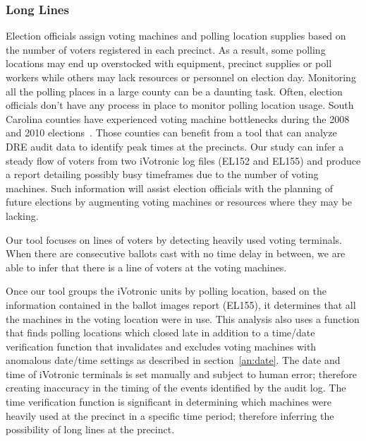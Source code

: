 \subsubsection{Long Lines}
Election officials assign voting machines and polling location supplies based on the number of voters registered in each precinct.  As a result, some polling locations may end up overstocked with equipment, precinct supplies or poll workers while others may lack resources or personnel on election day. Monitoring all the polling places in a large county can be a daunting task. Often, election officials don't have any process in place to monitor polling location usage. South Carolina counties have experienced voting machine bottlenecks during the 2008 and 2010 elections~\cite{Kreitman2010, Slade2008, U2010}.  Those counties can benefit from a tool that can analyze DRE audit data to identify peak times at the precincts.  Our study can infer a steady flow of voters from two iVotronic log files (EL152 and EL155) and produce a report detailing possibly busy timeframes due to the number of voting machines. Such information will assist election officials with the planning of future elections by augmenting voting machines or resources where they may be lacking.

Our tool focuses on lines of voters by detecting heavily used voting terminals. When there are consecutive ballots cast with no time delay in between, we are able to infer that there is a line of voters at the voting machines. 

Once our tool groups the iVotronic units by polling location, based on the information contained in the ballot images report (EL155), it determines that all the machines in the voting location were in use. This analysis also uses a function that finds polling locations which closed late in addition to a time/date verification function that invalidates and excludes voting machines with anomalous date/time settings as described in section~\ref{an:date}. The date and time of iVotronic terminals is set manually and subject to human error; therefore creating inaccuracy in the timing of the events identified by the audit log.  The time verification function is significant in determining which machines were heavily used at the precinct in a specific time period; therefore inferring the possibility of long lines at the precinct.

